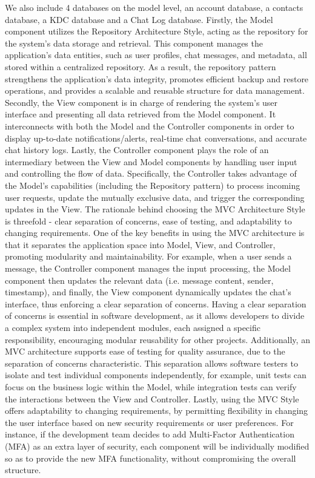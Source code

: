 \documentclass[]{article}
\begin{document}
\newline
\newline
We also include 4 databases on the model level, an account database, a contacts database, a KDC database and a Chat Log database.
\newline
\newline
Firstly, the Model component utilizes the Repository Architecture Style, acting as the repository for the system’s data storage and retrieval. This component manages the application's data entities, such as user profiles, chat messages, and metadata, all stored within a centralized repository. As a result, the repository pattern strengthens the application's data integrity, promotes efficient backup and restore operations, and provides a scalable and reusable structure for data management. Secondly, the View component is in charge of rendering the system’s user interface and presenting all data retrieved from the Model component. It interconnects with both the Model and the Controller components in order to display up-to-date notifications/alerts, real-time chat conversations, and accurate chat history logs. Lastly, the Controller component plays the role of an intermediary between the View and Model components by handling user input and controlling the flow of data. Specifically, the Controller takes advantage of the Model’s capabilities (including the Repository pattern) to process incoming user requests, update the mutually exclusive data, and trigger the corresponding updates in the View.
\newline\newline
The rationale behind choosing the MVC Architecture Style is threefold - clear separation of concerns, ease of testing, and adaptability to changing requirements. One of the key benefits in using the MVC architecture is that it separates the application space into Model, View, and Controller, promoting modularity and maintainability. For example, when a user sends a message, the Controller component manages the input processing, the Model component then updates the relevant data (i.e. message content, sender, timestamp), and finally, the View component dynamically updates the chat’s interface, thus enforcing a clear separation of concerns. Having a clear separation of concerns is essential in software development, as it allows developers to divide a complex system into independent modules, each assigned a specific responsibility, encouraging modular reusability for other projects. Additionally, an MVC architecture supports ease of testing for quality assurance, due to the separation of concerns characteristic. This separation allows software testers to isolate and test individual components independently, for example, unit tests can focus on the business logic within the Model, while integration tests can verify the interactions between the View and Controller. Lastly, using the MVC Style offers adaptability to changing requirements, by permitting flexibility in changing the user interface based on new security requirements or user preferences. For instance, if the development team decides to add Multi-Factor Authentication (MFA) as an extra layer of security, each component will be individually modified so as to provide the new MFA functionality, without compromising the overall structure.
\end{document}
